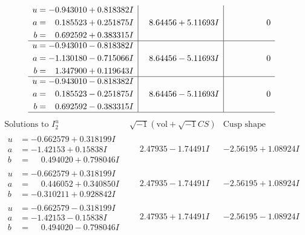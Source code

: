\documentclass[1p]{elsarticle_modified}
\theoremstyle{definition}
\newcommand{\I}{\sqrt{-1}}
\begin{document}
$$\begin{array}{c|c|c}
\begin{aligned}
u &= -0.943010 + 0.818382 I \\
a &= \phantom{-}0.185523 + 0.251875 I \\
b &= \phantom{-}0.692592 + 0.383315 I\end{aligned}
 & \phantom{-}8.64456 + 5.11693 I & \phantom{-0.000000 } 0 \\ \hline\begin{aligned}
u &= -0.943010 - 0.818382 I \\
a &= -1.130180 - 0.715066 I \\
b &= \phantom{-}1.347900 + 0.119643 I\end{aligned}
 & \phantom{-}8.64456 - 5.11693 I & \phantom{-0.000000 } 0 \\ \hline\begin{aligned}
u &= -0.943010 - 0.818382 I \\
a &= \phantom{-}0.185523 - 0.251875 I \\
b &= \phantom{-}0.692592 - 0.383315 I\end{aligned}
 & \phantom{-}8.64456 - 5.11693 I & \phantom{-0.000000 } 0\\
 \hline 
 \end{array}$$\newpage$$\begin{array}{c|c|c}  
\text{Solutions to }I^u_{2}& \I (\text{vol} + \sqrt{-1}CS) & \text{Cusp shape}\\
 \hline 
\begin{aligned}
u &= -0.662579 + 0.318199 I \\
a &= -1.42153 + 0.15838 I \\
b &= \phantom{-}0.494020 + 0.798046 I\end{aligned}
 & \phantom{-}2.47935 - 1.74491 I & -2.56195 + 1.08924 I \\ \hline\begin{aligned}
u &= -0.662579 + 0.318199 I \\
a &= \phantom{-}0.446052 + 0.340850 I \\
b &= -0.310211 + 0.928842 I\end{aligned}
 & \phantom{-}2.47935 - 1.74491 I & -2.56195 + 1.08924 I \\ \hline\begin{aligned}
u &= -0.662579 - 0.318199 I \\
a &= -1.42153 - 0.15838 I \\
b &= \phantom{-}0.494020 - 0.798046 I\end{aligned}
 & \phantom{-}2.47935 + 1.74491 I & -2.56195 - 1.08924 I \\ \hline\begin{aligned}

\end{aligned}
\end{array}$$
\end{document}
